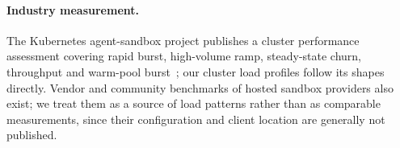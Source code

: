 \paragraph{Industry measurement.} The Kubernetes agent-sandbox project
publishes a cluster performance assessment covering rapid burst, high-volume
ramp, steady-state churn, throughput and warm-pool
burst~\cite{k8sagentsandbox}; our cluster load profiles follow its shapes
directly. Vendor and community benchmarks of hosted sandbox providers also
exist; we treat them as a source of load patterns rather than as comparable
measurements, since their configuration and client location are generally not
published.
